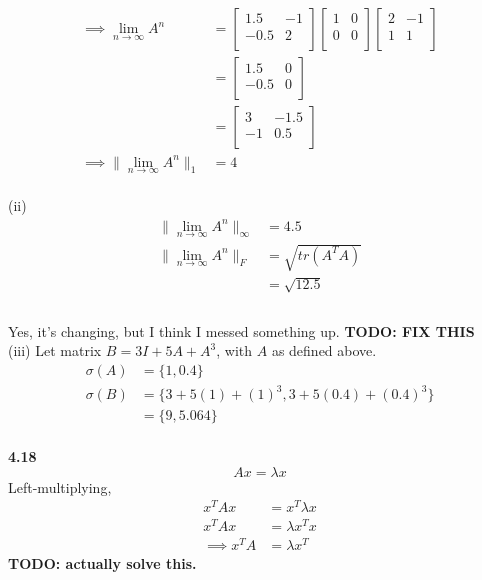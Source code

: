 \documentclass[letterpaper,12pt]{article}
\theoremstyle{definition}
\begin{document}
\begin{align*}
\implies \lim_{n \rightarrow \infty} A^n &=
\begin{bmatrix}
	1.5 & -1 \\
	-0.5 & 2 \\
\end{bmatrix}
\begin{bmatrix}
	1 & 0\\
	0 & 0\\
\end{bmatrix} \begin{bmatrix}
	2 & -1\\
	1 & 1 \\
\end{bmatrix}\\
&= \begin{bmatrix}
	1.5 & 0 \\
	-0.5 & 0 \\
\end{bmatrix}\\
&= \begin{bmatrix}
	3 & -1.5 \\
	-1 & 0.5 \\
\end{bmatrix}\\
\implies \| \lim_{n \rightarrow \infty} A^n \|_1 &= 4
\end{align*}\\

\noindent(ii) \begin{align*}
\| \lim_{n \rightarrow \infty} A^n \|_{\infty} &= 4.5\\
\| \lim_{n \rightarrow \infty} A^n \|_{F} &= \sqrt{tr(A^TA)}\\
&= \sqrt{12.5}\\
\end{align*}\\
Yes, it's changing, but I think I messed something up. \textbf{TODO: FIX THIS}\\

\noindent (iii) Let matrix $B = 3I + 5A + A^3$, with $A$ as defined above.
\begin{align*}
\sigma(A) &= \{1, 0.4\}\\
\sigma(B) &= \{3 + 5(1) + (1)^3, 3 + 5(0.4) + (0.4)^3\}\\
&= \{9, 5.064\}
\end{align*}\\

\noindent\textbf{4.18}
\begin{equation*}
Ax = \lambda x
\end{equation*}
Left-multiplying,
\begin{align*}
x^TAx &= x^T \lambda x \\
x^TAx &= \lambda x^T x\\
\implies x^TA &= \lambda x^T
\end{align*}
\textbf{TODO: actually solve this.}
\end{document}
